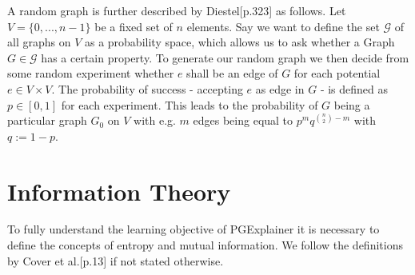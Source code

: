 A random graph is further described by Diestel\cite{Diestel2017}[p.323] as follows. Let $V = \{0,...,n-1\}$ be a fixed set of $n$ elements. Say we want to define the set $\mathcal{G}$ of all graphs on $V$ as a probability space, which allows us to ask whether a Graph $G \in \mathcal{G}$ has a certain property. To generate our random graph we then decide from some random experiment whether $e$ shall be an edge of $G$ for each potential $e \in V \times V$. The probability of success - accepting $e$ as edge in $G$ - is defined as $p \in [0,1]$ for each experiment. This leads to the probability of $G$ being a particular graph $G_0$ on $V$ with e.g. $m$ edges being equal to $p^m q^{\binom{n}{2}-m}$ with $q:=1-p$.
\bigskip


\section{Information Theory}
To fully understand the learning objective of PGExplainer it is necessary to define the concepts of entropy and mutual information. We follow the definitions by Cover et al.\cite{Cover2005}[p.13] if not stated otherwise.

